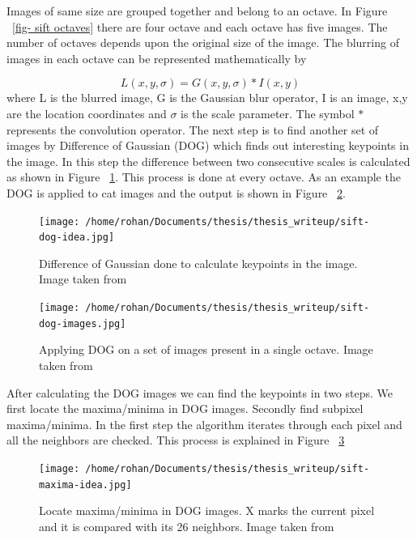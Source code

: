 \documentclass[12pt]{dalcsthesis}
\begin{document}
Images of same size are grouped together and belong to an octave. In Figure ~\ref{fig- sift octaves} there are four octave and each octave has five images. The number of octaves depends upon the original size of the image. The blurring of images in each octave can be represented mathematically by 

\begin{equation}
L(x,y,\sigma) = G(x,y,\sigma) * I(x,y)
\end{equation}
where L is the blurred image, G is the Gaussian blur operator, I is an image, x,y are the location coordinates and $\sigma$ is the scale parameter. The symbol $*$ represents the convolution operator.
The next step is to find another set of images by Difference of Gaussian (DOG) which finds out interesting keypoints in the image. In this step the difference between two consecutive scales is calculated as shown in Figure ~\ref{fig- sift dog}. This process is done at every octave. As an example the DOG is applied to cat images and the output is shown in Figure ~\ref{fig- sift dog images}. 

\begin{figure}
  \centering
     {\texttt{[image: /home/rohan/Documents/thesis/thesis\_writeup/sift-dog-idea.jpg]}}
  \caption{\label{fig- sift dog} Difference of Gaussian done to calculate keypoints in the image. Image taken from \cite{sift_url}}
\end{figure}


\begin{figure}
  \centering
     {\texttt{[image: /home/rohan/Documents/thesis/thesis\_writeup/sift-dog-images.jpg]}}
  \caption{\label{fig- sift dog images} Applying DOG on a set of images present in a single octave. Image taken from \cite{sift_url}}
\end{figure}

After calculating the DOG images we can find the keypoints in two steps. We first locate the maxima/minima in DOG images. Secondly find subpixel maxima/minima. In the first step the algorithm iterates through each pixel and all the neighbors are checked. This process is explained in Figure ~\ref{fig- maxima and minima sift octaves}

\begin{figure}
  \centering
     {\texttt{[image: /home/rohan/Documents/thesis/thesis\_writeup/sift-maxima-idea.jpg]}}
  \caption{\label{fig- maxima and minima sift octaves} Locate maxima/minima in DOG images. X marks the current pixel and it is compared with its 26 neighbors. Image taken from \cite{sift_url}}
\end{figure}
\end{document}
